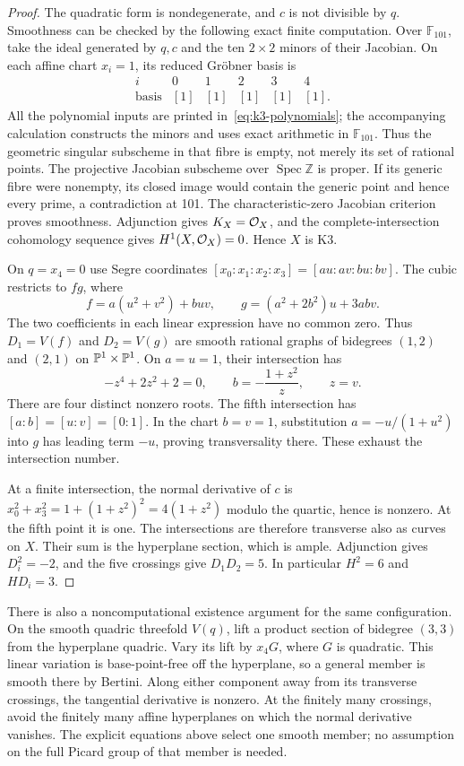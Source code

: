 \begin{proof}
The quadratic form is nondegenerate, and $c$ is not divisible by $q$.
Smoothness can be checked by the following exact finite computation.
Over $\mathbb F_{101}$, take the ideal generated by $q,c$ and the ten
$2\times2$ minors of their Jacobian. On each affine chart $x_i=1$,
its reduced Gr\"obner basis is
\[
\begin{array}{c|ccccc}
i&0&1&2&3&4\\ \hline
\text{basis}&[1]&[1]&[1]&[1]&[1].
\end{array}
\]
All the polynomial inputs are printed in~\eqref{eq:k3-polynomials};
the accompanying calculation constructs the minors and uses exact
arithmetic in $\mathbb F_{101}$. Thus the geometric singular subscheme
in that fibre is empty, not merely its set of rational points.
The projective Jacobian subscheme over $\operatorname{Spec}\mathbb Z$
is proper. If its generic fibre were nonempty, its closed image would
contain the generic point and hence every prime, a contradiction at
101. The characteristic-zero Jacobian criterion proves smoothness.
Adjunction gives $K_X=\mathcal O_X$, and the complete-intersection cohomology
sequence gives $H^1(X,\mathcal O_X)=0$. Hence $X$ is K3.

On $q=x_4=0$ use Segre coordinates
$[x_0:x_1:x_2:x_3]=[au:av:bu:bv]$. The cubic restricts to $fg$, where
\begin{equation}\label{eq:two-curves}
f=a(u^2+v^2)+buv,\qquad
g=(a^2+2b^2)u+3abv.
\end{equation}
The two coefficients in each linear expression have no common zero.
Thus $D_1=V(f)$ and $D_2=V(g)$ are smooth rational graphs of bidegrees
$(1,2)$ and $(2,1)$ on $\mathbb P^1\times\mathbb P^1$.
On $a=u=1$, their intersection has
\[
-z^4+2z^2+2=0,\qquad b=-\frac{1+z^2}{z},\qquad z=v.
\]
There are four distinct nonzero roots. The fifth intersection has
$[a:b]=[u:v]=[0:1]$. In the chart $b=v=1$, substitution
$a=-u/(1+u^2)$ into $g$ has leading term $-u$, proving transversality
there. These exhaust the intersection number.

At a finite intersection, the normal derivative of $c$ is
$x_0^2+x_3^2=1+(1+z^2)^2=4(1+z^2)$ modulo the quartic, hence is
nonzero. At the fifth point it is one. The intersections are therefore
transverse also as curves on $X$. Their sum is the hyperplane section,
which is ample. Adjunction gives $D_i^2=-2$, and the five crossings give
$D_1D_2=5$. In particular $H^2=6$ and $HD_i=3$.
\end{proof}

There is also a noncomputational existence argument for the same
configuration. On the smooth quadric threefold $V(q)$, lift a product
section of bidegree $(3,3)$ from the hyperplane quadric. Vary its lift by
$x_4G$, where $G$ is quadratic. This linear variation is base-point-free
off the hyperplane, so a general member is smooth there by Bertini.
Along either component away from its transverse crossings, the
tangential derivative is nonzero. At the finitely many crossings, avoid
the finitely many affine hyperplanes on which the normal derivative
vanishes. The explicit equations above select one smooth member; no
assumption on the full Picard group of that member is needed.

